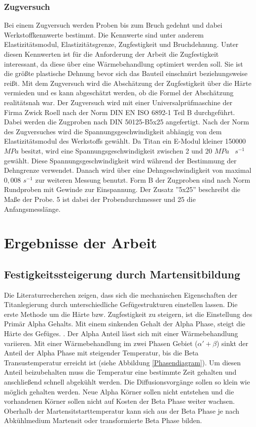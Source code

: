 \documentclass[a4paper, 11pt]{tubsreprt}
\begin{document}
\subsection{Zugversuch}
\label{Kapitel Zugversuch}
Bei einem Zugversuch werden Proben bis zum Bruch gedehnt und dabei Werkstoffkennwerte bestimmt. Die Kennwerte sind unter anderem  Elastizitätsmodul, Elastizitätsgrenze, Zugfestigkeit und Bruchdehnung. Unter diesen Kennwerten ist für die Anforderung der Arbeit die Zugfestigkeit interessant, da diese über eine Wärmebehandlung optimiert werden soll. Sie ist die größte plastische Dehnung bevor sich das Bauteil einschnürt beziehungsweise reißt. Mit dem Zugversuch wird die Abschätzung der Zugfestigkeit über die Härte vermieden und es kann abgeschätzt werden, ob die Formel der Abschätzung realitätsnah war. Der Zugversuch wird mit einer Universalprüfmaschine der Firma Zwick Roell nach der Norm DIN EN ISO 6892-1 Teil B durchgeführt. Dabei werden die Zugproben nach DIN 50125-B5x25 angefertigt. Nach der Norm des Zugversuches wird die Spannungsgeschwindigkeit abhängig von dem Elastizitätsmodul des Werkstoffs gewählt. Da Titan ein E-Modul kleiner 150000 $MPa$ besitzt, wird eine Spannungsgeschwindigkeit zwischen 2 und 20 $MPa$~ $s^{-1}$ gewählt. Diese Spannungsgeschwindigkeit wird während der Bestimmung der Dehngrenze verwendet. Danach wird über eine Dehngeschwindigkeit von maximal $0,008$ $s^{-1}$ zur weiteren Messung benutzt. Form B der Zugproben sind nach Norm Rundproben mit Gewinde zur Einspannung. Der Zusatz ''5x25'' beschreibt die Maße der Probe. 5 ist dabei der Probendurchmesser und 25 die Anfangsmesslänge. 

\chapter{Ergebnisse der Arbeit}
\section{Festigkeitssteigerung durch Martensitbildung}\label{Festigkeitssteigerung durch Martensitbildung}
Die Literaturrecherchen zeigen, dass sich die mechanischen Eigenschaften der Titanlegierung durch unterschiedliche Gefügestrukturen einstellen lassen. Die erste Methode um die Härte bzw. Zugfestigkeit zu steigern, ist die Einstellung des Primär Alpha Gehalts. Mit einem sinkenden Gehalt der Alpha Phase, steigt die Härte des Gefüges. \cite{Sahoo2015}. Der Alpha Anteil lässt sich mit einer Wärmebehandlung variieren. 
Mit einer Wärmebehandlung im zwei Phasen Gebiet ($\alpha'+ \beta$) sinkt der Anteil der Alpha Phase mit steigender Temperatur, bis die Beta Transustemperatur erreicht ist (siehe Abbildung \ref{Phasendiagram}). Um diesen Anteil beizubehalten muss die Temperatur eine bestimmte Zeit gehalten und anschließend schnell abgekühlt werden. Die Diffusionsvorgänge sollen so klein wie möglich gehalten werden. Neue Alpha Körner sollen nicht entstehen und die vorhandenen Körner sollen nicht auf Kosten der Beta Phase weiter wachsen. Oberhalb der Martensitstarttemperatur kann sich aus der Beta Phase je nach Abkühlmedium Martensit oder transformierte Beta Phase bilden.
\end{document}
